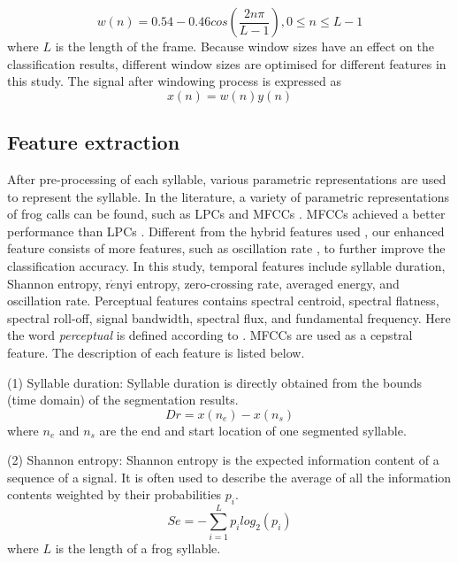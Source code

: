 \begin{equation}
w(n)=0.54-0.46cos(\frac{2n\pi}{L-1}), 0 \leq n \leq L-1
\end{equation}
where $L$ is the length of the frame. Because window sizes have an effect on the classification results, different window sizes are optimised for different features in this study. The signal after windowing process is expressed as
\begin{equation}
x(n) = w(n)y(n)
\end{equation}

\subsection{Feature extraction}
After pre-processing of each syllable, various parametric representations are used to represent the syllable. In the literature, a variety of parametric representations of frog calls can be found, such as LPCs and MFCCs \citep{yuan2012frog, jaafar2013automatic, bedoya2014automatic}.
MFCCs achieved a better performance than LPCs \citep{yuan2012frog}. Different from the hybrid features used \citep{huang2009frog, han2011acoustic, Gingras2013}, our enhanced  feature consists of more features, such as oscillation rate \citep{Xie1504:Acoustic}, to further improve the classification accuracy. In this study, temporal features include syllable duration, Shannon entropy, r$\acute{e}$nyi entropy, zero-crossing rate, averaged energy, and oscillation rate. Perceptual features contains spectral centroid, spectral flatness, spectral roll-off, signal bandwidth, spectral flux, and fundamental frequency. Here the word \textit{perceptual} is defined according to \citep{lei2014content}. MFCCs are used as a cepstral feature. The description of each feature is listed below.

\vspace{3mm}

\noindent(1) Syllable duration: Syllable duration \citep{Xie1504:Acoustic} is directly obtained from the bounds (time domain) of the segmentation results.
\begin{equation}
Dr = x(n_{e}) - x(n_{s})
\end{equation}
where $n_{e}$ and $n_{s}$ are the end and start location of one segmented syllable.

\vspace{3mm}

\noindent(2) Shannon entropy: Shannon entropy is the expected information content of a sequence of a signal. It is often used to describe the average of all the information contents weighted by their probabilities $p_{i}$.
\begin{equation}
Se=-\sum_{i=1}^{L}p_{i}log_{2}(p_{i})
\end{equation}
where $L$ is the length of a frog syllable.

